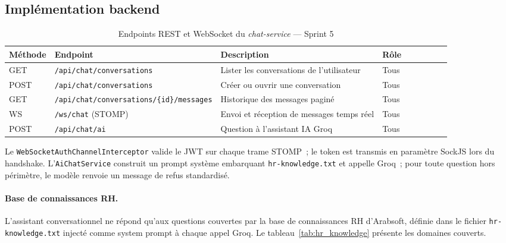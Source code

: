 \subsection{Implémentation backend}

\begin{table}[H]
\centering
\caption{Endpoints REST et WebSocket du \textit{chat-service} — Sprint 5}
\label{tab:api_chat_s5}
\begin{tabularx}{\textwidth}{VlVlVLVlV}
\hline
\textbf{Méthode} & \textbf{Endpoint} & \textbf{Description} & \textbf{Rôle} \\
\hline
GET & \texttt{/api/chat/conversations} & Lister les conversations de l’utilisateur & Tous \\
\hline
POST & \texttt{/api/chat/conversations} & Créer ou ouvrir une conversation & Tous \\
\hline
GET & \texttt{/api/chat/conversations/\{id\}/messages} & Historique des messages paginé & Tous \\
\hline
WS & \texttt{/ws/chat} (STOMP) & Envoi et réception de messages temps réel & Tous \\
\hline
POST & \texttt{/api/chat/ai} & Question à l’assistant IA Groq & Tous \\
\hline
\end{tabularx}
\end{table}

Le \texttt{WebSocketAuthChannelInterceptor} valide le JWT sur chaque trame STOMP~;
le token est transmis en paramètre SockJS lors du handshake. L’\texttt{AiChatService}
construit un prompt système embarquant \texttt{hr-knowledge.txt} et appelle Groq~;
pour toute question hors périmètre, le modèle renvoie un message de refus standardisé.

\paragraph{Base de connaissances RH.}
L’assistant conversationnel ne répond qu’aux questions couvertes par la base de
connaissances RH d’Arabsoft, définie dans le fichier \texttt{hr-knowledge.txt}
injecté comme system prompt à chaque appel Groq. Le tableau~\ref{tab:hr_knowledge}
présente les domaines couverts.

